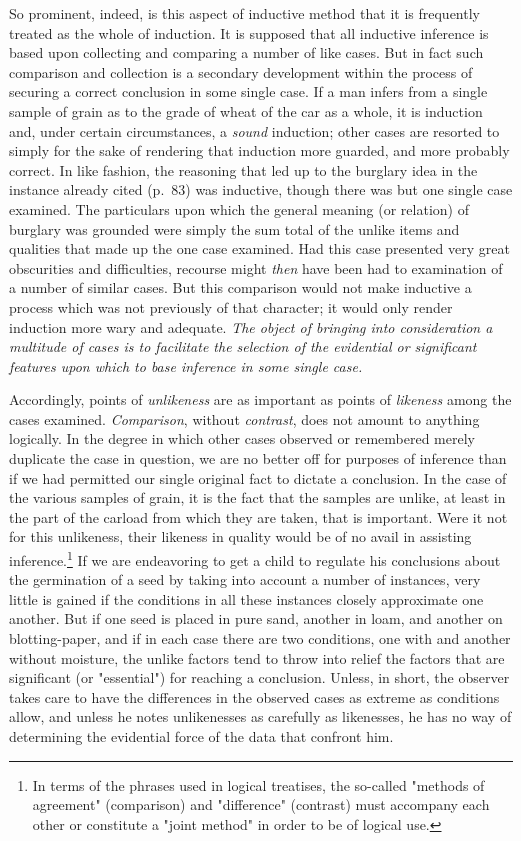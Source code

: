 \documentclass[showtrims,ustradepaper]{memoir}
\begin{document}
So prominent, indeed, is this aspect of inductive method that it is
frequently treated as the whole of induction. It is supposed that all
inductive inference is based upon collecting and comparing a number of
like cases. But in fact such comparison and collection is
a
secondary development within the process of securing a correct
conclusion in some single case. If a man infers from a single sample of
grain as to the grade of wheat of the car as a whole, it is induction
and, under certain circumstances, a \emph{sound} induction; other cases
are resorted to simply for the sake of rendering that induction more
guarded, and more probably correct. In like fashion, the reasoning that
led up to the burglary idea in the instance already cited (p.\ 83) was
inductive, though there was but one single case examined. The
particulars upon which the general meaning (or relation) of burglary was
grounded were simply the sum total of the unlike items and qualities
that made up the one case examined. Had this case presented very great
obscurities and difficulties, recourse might \emph{then} have been had
to examination of a number of similar cases. But this comparison would
not make inductive a process which was not previously of that character;
it would only render induction more wary and adequate. \emph{The object
of bringing into consideration a multitude of cases is to facilitate the
selection of the evidential or significant features upon which to base
inference in some single case.}


Accordingly, points of \emph{unlikeness} are as important as points of
\emph{likeness} among the cases examined. \emph{Comparison}, without
\emph{contrast}, does not amount to anything logically. In the degree in
which other cases observed or remembered merely duplicate the case in
question, we are no better off for purposes of inference than if we had
permitted our single original fact to dictate a conclusion. In the case
of the various samples of grain, it is the fact that the samples are
unlike, at least in the part of the carload from which they are taken,
that is important. Were it not for this unlikeness, their
likeness
in quality would be of no avail in assisting
inference.\footnote{
In terms of the phrases used in logical treatises, the so-called
"methods of agreement" (comparison) and "difference" (contrast) must
accompany each other or constitute a "joint method" in order to be of
logical use.
}
If we are endeavoring to get a child to regulate his conclusions about
the germination of a seed by taking into account a number of instances,
very little is gained if the conditions in all these instances closely
approximate one another. But if one seed is placed in pure sand, another
in loam, and another on blotting-paper, and if in each case there are
two conditions, one with and another without moisture, the unlike
factors tend to throw into relief the factors that are significant (or
"essential") for reaching a conclusion. Unless, in short, the observer
takes care to have the differences in the observed cases as extreme as
conditions allow, and unless he notes unlikenesses as carefully as
likenesses, he has no way of determining the evidential force of the
data that confront him.
\end{document}
